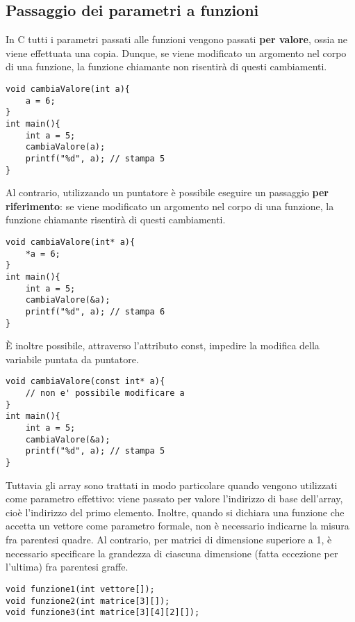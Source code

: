 \subsection{Passaggio dei parametri a funzioni}
In C tutti i parametri passati alle funzioni vengono passati \textbf{per valore}, ossia ne viene effettuata una copia. Dunque, se viene modificato un argomento nel corpo di una funzione, la funzione chiamante non risentirà di questi cambiamenti.
\begin{lstlisting}[title={Il passaggio per valore}]
void cambiaValore(int a){
    a = 6;
}
int main(){
    int a = 5;
    cambiaValore(a);
    printf("%d", a); // stampa 5
}
\end{lstlisting}
Al contrario, utilizzando un puntatore è possibile eseguire un passaggio \textbf{per riferimento}: se viene modificato un argomento nel corpo di una funzione, la funzione chiamante risentirà di questi cambiamenti.
\begin{lstlisting}[title={Il passaggio per riferimento}]
void cambiaValore(int* a){
    *a = 6;
}
int main(){
    int a = 5;
    cambiaValore(&a);
    printf("%d", a); // stampa 6
}
\end{lstlisting}

\`{E} inoltre possibile, attraverso l'attributo \colorbox{light-gray}{const}, impedire la modifica della variabile puntata da puntatore.
\begin{lstlisting}[title={Utilizzo dell'attributo const}]
void cambiaValore(const int* a){
    // non e' possibile modificare a
}
int main(){
    int a = 5;
    cambiaValore(&a);
    printf("%d", a); // stampa 5
}
\end{lstlisting}

Tuttavia gli array sono trattati in modo particolare quando vengono utilizzati come parametro effettivo: viene passato per valore l’indirizzo di base dell’array, cioè l’indirizzo del primo elemento. Inoltre, quando si dichiara una funzione che accetta un vettore come parametro formale, non è necessario indicarne la misura fra parentesi quadre. Al contrario, per matrici di dimensione superiore a 1, è necessario specificare la grandezza di ciascuna dimensione (fatta eccezione per l'ultima) fra parentesi graffe.
\begin{lstlisting}[title={Dichiarazione di funzioni con vettori e matrici come parametri formali}]
void funzione1(int vettore[]);
void funzione2(int matrice[3][]);
void funzione3(int matrice[3][4][2][]);
\end{lstlisting}

